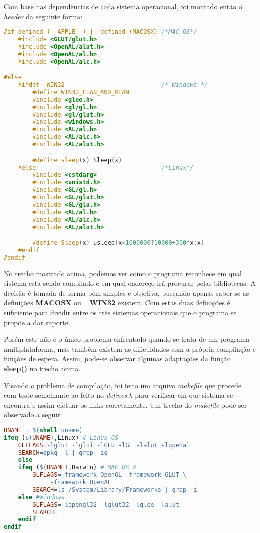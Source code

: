 Com base nas dependências de cada sistema operacional, foi montado então o \textit{header} da seguinte forma:

\begin{lstlisting}[language=C++,title=\textit{defines.h},firstnumber=5,numbers=none]
#if defined (__APPLE__) || defined (MACOSX) /*MAC OS*/
    #include <GLUT/glut.h>
	#include <OpenAL/alut.h>
	#include <OpenAL/al.h>
	#include <OpenAL/alc.h>

#else
    #ifdef _WIN32                           /* Windows */
    	#define WIN32_LEAN_AND_MEAN
        #include <glee.h>
        #include <gl/gl.h>
		#include <gl/glut.h>
        #include <windows.h>
        #include <AL/al.h>
		#include <AL/alc.h>
		#include <AL/alut.h>

        #define sleep(x) Sleep(x)
    #else                                   /*Linux*/
    	#include <cstdarg>
    	#include <unistd.h>
        #include <GL/gl.h>
        #include <GL/glut.h>
        #include <GL/glu.h>
        #include <AL/al.h>
		#include <AL/alc.h>
		#include <AL/alut.h>

        #define Sleep(x) usleep(x<1000000?10000+300*x:x)
    #endif
#endif
\end{lstlisting}

No trecho mostrado acima, podemos ver como o programa reconhece em qual sistema esta sendo compilado e em qual endereço irá procurar pelas bibliotecas. A decisão é tomada de forma bem simples e objetiva, buscando apenas saber se as definições \textbf{MACOSX} ou \textbf{\_WIN32} existem. Com estas duas definições é suficiente para dividir entre os três sistemas operacionais que o programa se propõe a dar suporte. 

Porém este não é o único problema enfrentado quando se trata de um programa multiplataforma, mas também existem as dificuldades com a própria compilação e funções de espera. Assim, pode-se observar algumas adaptações da função \textbf{sleep()} no trecho acima.

Visando o problema de compilação, foi feito um arquivo \textit{makefile} que procede com teste semelhante ao feito no \textit{defines.h} para verificar em que sistema se encontra e assim efetuar os links corretamente. Um trecho do \textit{makefile} pode ser observado a seguir:

\begin{lstlisting}[language=make,title=\textit{Makefile},firstnumber=48,numbers=none]
UNAME = $(shell uname)
ifeq ($(UNAME),Linux) # Linux OS
	GLFLAGS=-lglut -lglui -lGLU -lGL -lalut -lopenal
	SEARCH=dpkg -l | grep -iq
	else
	ifeq ($(UNAME),Darwin) # MAC OS X
		GLFLAGS=-framework OpenGL -framework GLUT \
			 -framework OpenAL
		SEARCH=ls /System/Library/Frameworks | grep -i
	else #Windows
		GLFLAGS=-lopengl32 -lglut32 -lglee -lalut
		SEARCH=
	endif
endif
\end{lstlisting}


